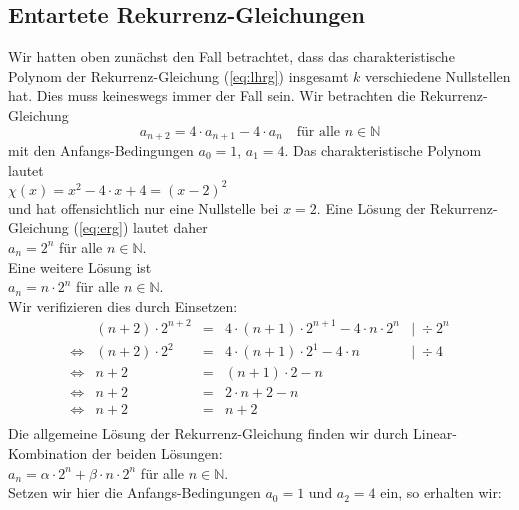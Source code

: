 \subsection{Entartete Rekurrenz-Gleichungen}
Wir hatten oben zunächst den Fall betrachtet, dass das charakteristische Polynom der
Rekurrenz-Gleichung (\ref{eq:lhrg}) insgesamt $k$ verschiedene Nullstellen hat.   Dies muss
keineswegs immer der Fall sein.  Wir betrachten die Rekurrenz-Gleichung 
\begin{equation}
  \label{eq:erg}
  a_{n+2} = 4 \cdot a_{n+1} - 4 \cdot a_n \quad \mbox{für alle $n \in \mathbb{N}$} 
\end{equation}
 mit den Anfangs-Bedingungen $a_0 = 1$, $a_1 = 4$.  Das charakteristische Polynom lautet \\[0.2cm]
\hspace*{1.3cm} $\chi(x) = x^2 - 4 \cdot x + 4 = (x - 2)^2$ \\[0.2cm]
und hat offensichtlich nur eine Nullstelle bei $x = 2$.   Eine Lösung der
Rekurrenz-Gleichung (\ref{eq:erg}) lautet daher \\[0.2cm]
\hspace*{1.3cm} $a_n = 2^n$ \quad für alle $n \in \mathbb{N}$. \\[0.2cm]
Eine weitere Lösung ist \\[0.2cm]
\hspace*{1.3cm} $a_n = n \cdot 2^n$ \quad für alle $n \in \mathbb{N}$.  \\[0.2cm]
Wir verifizieren dies durch Einsetzen: 
\[
\begin{array}{llcll}
 & (n+2) \cdot 2^{n+2} & = & 4 \cdot (n+1) \cdot 2^{n+1} - 4 \cdot n \cdot 2^n & \mid\; \div 2^n \\
\Leftrightarrow & 
   (n+2) \cdot 2^{2} & = & 4 \cdot (n+1) \cdot 2^{1} - 4 \cdot n  &  \mid\; \div 4 \\
\Leftrightarrow & n + 2 & = & (n + 1) \cdot 2 -  n  &  \\
\Leftrightarrow & n + 2 & = & 2 \cdot n + 2 -  n   \\
\Leftrightarrow & n + 2 & = & n + 2    \\
\end{array}
\]
Die allgemeine Lösung der Rekurrenz-Gleichung finden wir durch Linear-Kombination der
beiden Lösungen: \\[0.2cm]
\hspace*{1.3cm} $a_n = \alpha \cdot 2^n + \beta \cdot n \cdot 2^n$ \quad für alle $n \in \mathbb{N}$. \\[0.2cm]
Setzen wir hier die Anfangs-Bedingungen $a_0 = 1$ und $a_2 = 4$ ein, so erhalten wir:

